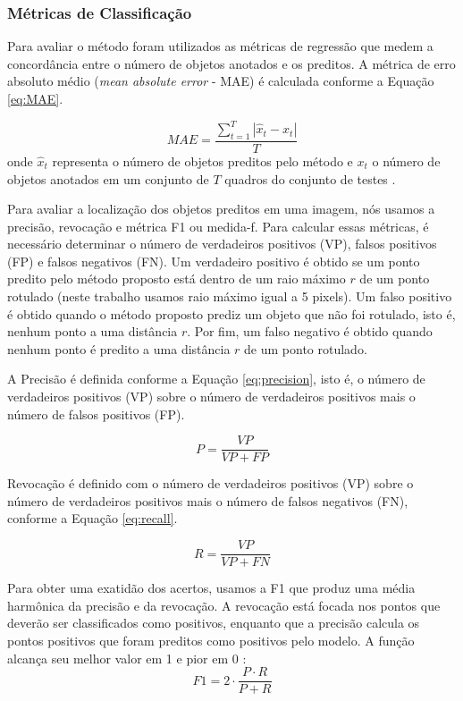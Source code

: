 \subsubsection{Métricas de Classificação}
Para avaliar o método foram utilizados as métricas de regressão que medem a concordância entre o número de objetos anotados e os preditos. A métrica de erro absoluto médio (\textit{mean absolute error} - MAE) é calculada conforme a Equação \ref{eq:MAE}.

\begin{equation}
\label{eq:MAE}
    MAE = \frac{\sum^{T}_{t=1}{|\hat{x}_t-{x}_t|}}{T}
\end{equation}
onde $\hat{x}_t$ representa o número de objetos preditos pelo método e ${x_t}$ o número de objetos anotados em um conjunto de $T$ quadros do conjunto de testes \cite{MAE}.


Para avaliar a localização dos objetos preditos em uma imagem, nós usamos a precisão, revocação e métrica F1 ou medida-f.
Para calcular essas métricas, é necessário determinar o número de verdadeiros positivos (VP), falsos positivos (FP) e falsos negativos (FN).
Um verdadeiro positivo é obtido se um ponto predito pelo método proposto está dentro de um raio máximo $r$ de um ponto rotulado (neste trabalho usamos raio máximo igual a 5 pixels).
Um falso positivo é obtido quando o método proposto prediz um objeto que não foi rotulado, isto é, nenhum ponto a uma distância $r$.
Por fim, um falso negativo é obtido quando nenhum ponto é predito a uma distância $r$ de um ponto rotulado.

A Precisão é definida conforme a Equação \ref{eq:precision}, isto é, o número de verdadeiros positivos (VP) sobre o número de verdadeiros positivos mais o número de falsos positivos (FP).

\begin{equation}
\label{eq:precision}
    P = \frac{VP}{VP+FP}
\end{equation}

Revocação é definido com o número de verdadeiros positivos (VP) sobre o número de verdadeiros positivos mais o número de falsos negativos (FN), conforme a Equação \ref{eq:recall}.

\begin{equation}
    \label{eq:recall}
    R = \frac{VP}{VP+FN}
\end{equation}

Para obter uma exatidão dos acertos, usamos a F1 que produz uma média harmônica da precisão e da revocação. A revocação está focada nos pontos que deverão ser classificados como positivos, enquanto que a precisão calcula os pontos positivos que foram preditos como positivos pelo modelo. A função alcança seu melhor valor em 1 e pior em 0 \cite{f1}:
\begin{equation}
    F1 = 2 \cdot \frac{P\cdot R}{P + R}
\end{equation}

